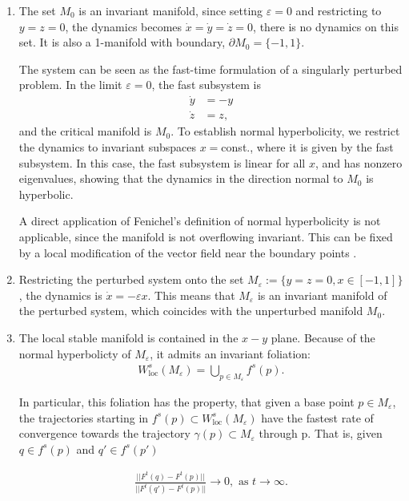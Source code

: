 \begin{solution}[9.5]
	\begin{enumerate}
		\item The set $M_0$ is an invariant manifold, since setting $\varepsilon =0$ and restricting to $y=z=0$, the dynamics becomes $\dot{x}=\dot{y}=\dot{z}=0$, there is no dynamics on this set. It is also a 1-manifold with boundary, $\partial M_0 = \{ -1, 1\}$. 

The system can be seen as the fast-time formulation of a singularly perturbed problem. In the limit $\varepsilon =0$, the fast subsystem is 
\begin{align}
    \dot{y} &= -y \\
    \dot{z} &= z,
\end{align}
and the critical manifold is $M_0$. To establish normal hyperbolicity, we restrict the dynamics to invariant subspaces $x=$const., where it is given by the fast subsystem. In this case, the fast subsystem is linear for all $x$, and has nonzero eigenvalues, showing that the dynamics in the direction normal to $M_0$ is hyperbolic. 

A direct application of Fenichel's definition of normal hyperbolicity is not applicable, since the manifold is not overflowing invariant. This can be fixed by a local modification of the vector field near the boundary points \cite{Wiggins1994} . 
\item		
Restricting the perturbed system onto the set $M_\varepsilon := \{ y=z=0, x\in [-1,1]\}$, the dynamics is  $\dot{x} = -\varepsilon x$. This means that $M_\varepsilon$ is an invariant manifold of the perturbed system, which coincides with the unperturbed manifold $M_0$. 

\item
The local stable manifold is contained in the $x-y$ plane. Because of the normal hyperbolicty of $M_\varepsilon$, it admits an invariant foliation:
\begin{align}
W^s_{\text{loc}}(M_\varepsilon) = \bigcup_{p\in M_\varepsilon} f^s(p).
\end{align}

In particular, this foliation has the property, that given a base point $p\in M_\varepsilon$, the trajectories starting in $f^s(p)\subset W^s_{\text{loc}}(M_\varepsilon) $ have the fastest rate of convergence towards the trajectory $\gamma(p)\subset M_\varepsilon$ through p. That is, given $q\in f^s(p)$ and $q'\in f^s(p')$

\begin{align}
\label{conds}
    \frac{||F^t(q) - F^t(p)||}{||F^t(q') - F^t(p)||}\to 0, \text{ as } t\to \infty.
\end{align}


\end{enumerate}
\end{solution}
